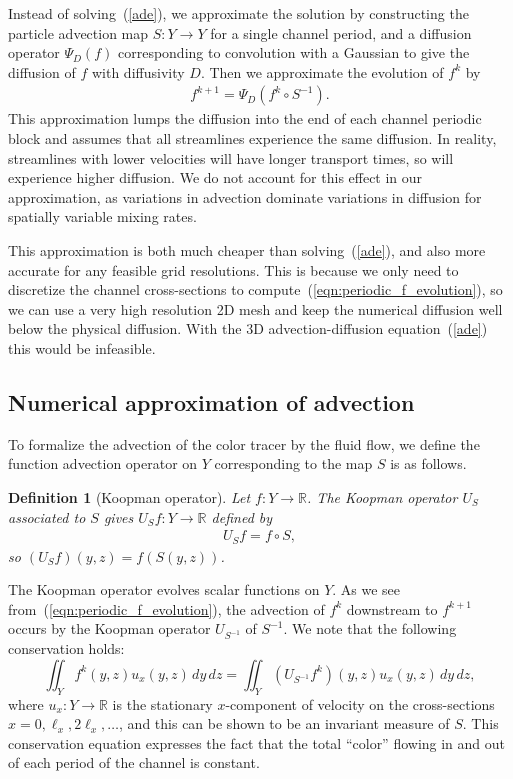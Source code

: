 \documentclass[times]{fldauth}
\newtheorem{definition}{Definition}
\begin{document}
Instead of solving~(\ref{ade}), we approximate the solution by
constructing the particle advection map $S : Y \to Y$ for a single
channel period, and a diffusion operator $\Psi_D(f)$ corresponding to
convolution with a Gaussian to give the diffusion of $f$ with
diffusivity $D$. Then we approximate the evolution of $f^k$ by
\begin{align}
  \label{eqn:periodic_f_evolution}
  f^{k+1} = \Psi_D(f^k \circ S^{-1}).
\end{align}
This approximation lumps the diffusion into the end of each channel
periodic block and assumes that all streamlines experience the same
diffusion. In reality, streamlines with lower velocities will have
longer transport times, so will experience higher diffusion. We do not
account for this effect in our approximation, as variations in
advection dominate variations in diffusion for spatially variable
mixing rates.

This approximation is both much cheaper than solving~(\ref{ade}), and
also more accurate for any feasible grid resolutions. This is because
we only need to discretize the channel cross-sections to
compute~(\ref{eqn:periodic_f_evolution}), so we can use a very high
resolution 2D mesh and keep the numerical diffusion well below the
physical diffusion. With the 3D advection-diffusion
equation~(\ref{ade}) this would be infeasible.

\subsection{Numerical approximation of advection}

To formalize the advection of the color tracer by the fluid flow, we
define the function advection operator on $Y$ corresponding to the map
$S$ is as follows.

\begin{definition}[Koopman operator]
  Let $f : Y \to \mathbb{R}$. The \emph{Koopman operator} $U_S$
  associated to $S$ gives $U_S f : Y \to \mathbb{R}$ defined by
 \begin{align}
   U_S f = f \circ S,
 \end{align}
so $(U_S f)(y,z) = f(S(y,z))$.
\end{definition}
The Koopman operator evolves scalar functions on $Y$. As we see
from~(\ref{eqn:periodic_f_evolution}), the advection of $f^k$
downstream to $f^{k+1}$ occurs by the Koopman operator $U_{S^{-1}}$ of
$S^{-1}$. We note that the following conservation holds:
\begin{equation}
\label{fvc}
  \iint_Y f^k(y,z) u_x(y,z) \,dy\,dz = \iint_Y (U_{S^{-1}} f^k)(y,z) u_x(y,z) \,dy\,dz,
\end{equation}
where $u_x: Y \to \mathbb{R}$ is the stationary $x$-component of
velocity on the cross-sections $x=0, \ell_x, 2\ell_x, \ldots$, and
this can be shown to be an invariant measure of $S$. This conservation
equation expresses the fact that the total ``color'' flowing in and
out of each period of the channel is constant.
\end{document}

